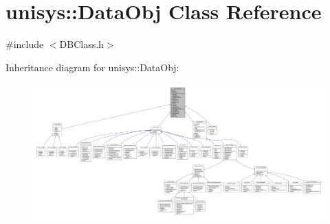 \hypertarget{classunisys_1_1DataObj}{\section{unisys\-:\-:Data\-Obj Class Reference}
\label{classunisys_1_1DataObj}
}


{\ttfamily \#include $<$D\-B\-Class.\-h$>$}



Inheritance diagram for unisys\-:\-:Data\-Obj\-:
\nopagebreak
\begin{figure}[H]
\begin{center}
\leavevmode
\includegraphics[width=350pt]{classunisys_1_1DataObj__inherit__graph}
\end{center}
\end{figure}


